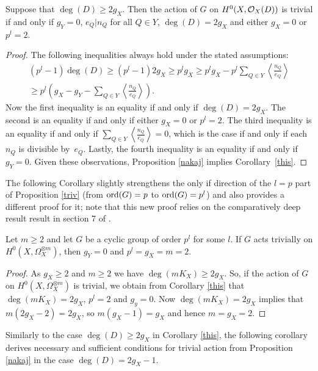 \begin{cor}\label{this}
Suppose that $\deg(D)\geq 2g_X$. Then the action of $G$ on $H^0(X,{\cal O}_X(D))$ is trivial if and 
only if $g_Y = 0$, $e_Q | n_Q$ for all $Q\in Y$, $\deg(D)=2g_X$ and either $g_X=0$ or $p^l=2$.
\end{cor}
\begin{proof}
The following inequalities always hold under the stated assumptions:
\begin{multline}
(p^l-1)\deg(D)\geq (p^l-1)2g_X \geq p^lg_X \geq p^lg_X-p^l\sum_{Q\in Y}\left\langle\frac{n_Q}{e_Q}\right\rangle \\ \geq p^l\left( g_X - g_Y -\sum_{Q\in Y}\left\langle \frac{n_Q}{e_Q} \right\rangle \right).
\end{multline}
Now the first inequality is an equality if and only if $\deg(D)=2g_X$. 
The second is an equality if and only if either $g_X=0$ or $p^l=2$. 
The third inequality is an equality if and only if $\sum_{Q\in Y}\left\langle\frac{n_Q}{e_Q}\right\rangle=0$, which is the case if and only if each $n_Q$ is divisible by~$e_Q$. 
Lastly, the fourth inequality is an equality if and only if $g_Y = 0$.
Given these observations, Proposition \ref{nakaj} implies Corollary~\ref{this}.
\end{proof}

The following Corollary slightly strengthens the only if direction of the $l=p$ part of Proposition \ref{triv}
(from $\operatorname{ord}(G) = p$ to $\operatorname{ord}(G) = p^l$) and also provides a different proof for it;
note that this new proof relies on the comparatively deep result result in section 7 of \cite{cohogsheaves}.


\begin{cor}
Let $m \geq 2$ and let $G$ be a cyclic group of order $p^l$ for some $l$. 
If $G$ acts trivially on $H^0(X,\Omega_X^{\otimes m})$, then $g_Y = 0$ and $p^l = g_X = m = 2$.
\end{cor}
\begin{proof}
As $g_X \geq 2$ and $m\geq 2$ we have $\deg(mK_X) \geq 2g_X$. 
So, if the action of $G$ on $H^0(X,\Omega_X^{\otimes m})$ is trivial, we obtain from Corollary \ref{this} that $\deg(mK_X) = 2g_X$, $p^l = 2$ and $g_y = 0$.
Now $\deg (mK_X) = 2g_X$ implies that $m(2g_X -2 ) = 2g_X$, so $m(g_X -1) = g_X$ and hence $m=g_X=2$.
\end{proof}

Similarly to the case $\deg(D)\geq 2g_X$ in Corollary \ref{this}, the following corollary derives necessary and sufficient conditions for trivial action from Proposition \ref{nakaj} in the case $\deg(D) =2g_X-1$.



